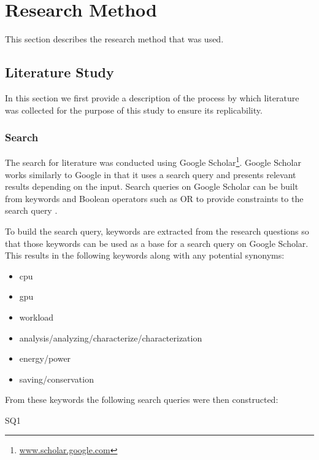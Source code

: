 \section{Research Method}
	This section describes the research method that was used.

	\subsection{Literature Study}
		In this section we first provide a description of the process by which literature was collected for the purpose of this study to ensure its replicability.

		\subsubsection{Search}
			The search for literature was conducted using Google Scholar\footnote{\url{www.scholar.google.com}}.
			Google Scholar works similarly to Google in that it uses a search query and presents relevant results depending on the input.
			Search queries on Google Scholar can be built from keywords and Boolean operators such as OR to provide constraints to the search query \parencite{Russel}.
		
			To build the search query, keywords are extracted from the research questions so that those keywords can be used as a base for a search query on Google Scholar.
			This results in the following keywords along with any potential synonyms:
			\begin{itemize}
				\item \acrshort{cpu}
				\item \acrshort{gpu}
				\item workload
				\item analysis/analyzing/characterize/characterization
				\item energy/power
				\item saving/conservation
			\end{itemize}
		
			From these keywords the following search queries were then constructed:
			\begin{aligneddescription}{SQ1}
				\item[SQ1] \sqOne
				\item[SQ2] \sqTwo
			\end{aligneddescription}
			
